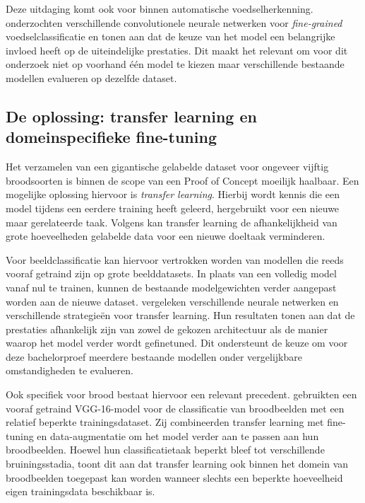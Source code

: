 Deze uitdaging komt ook voor binnen automatische voedselherkenning. \textcite{Boyd_2024} onderzochten verschillende convolutionele neurale netwerken voor \textit{fine-grained} voedselclassificatie en tonen aan dat de keuze van het model een belangrijke invloed heeft op de uiteindelijke prestaties. Dit maakt het relevant om voor dit onderzoek niet op voorhand één model te kiezen maar verschillende bestaande modellen evalueren op dezelfde dataset.

\subsection{De oplossing: transfer learning en domeinspecifieke fine-tuning}

Het verzamelen van een gigantische gelabelde dataset voor ongeveer vijftig broodsoorten is binnen de scope van een Proof of Concept moeilijk haalbaar. Een mogelijke oplossing hiervoor is \textit{transfer learning}. Hierbij wordt kennis die een model tijdens een eerdere training heeft geleerd, hergebruikt voor een nieuwe maar gerelateerde taak. Volgens \textcite{Zhuang_2021} kan transfer learning de afhankelijkheid van grote hoeveelheden gelabelde data voor een nieuwe doeltaak verminderen.

Voor beeldclassificatie kan hiervoor vertrokken worden van modellen die reeds vooraf getraind zijn op grote beelddatasets. In plaats van een volledig model vanaf nul te trainen, kunnen de bestaande modelgewichten verder aangepast worden aan de nieuwe dataset. \textcite{Abou_Baker_2022} vergeleken verschillende neurale netwerken en verschillende strategieën voor transfer learning. Hun resultaten tonen aan dat de prestaties afhankelijk zijn van zowel de gekozen architectuur als de manier waarop het model verder wordt gefinetuned. Dit ondersteunt de keuze om voor deze bachelorproef meerdere bestaande modellen onder vergelijkbare omstandigheden te evalueren.

Ook specifiek voor brood bestaat hiervoor een relevant precedent. \textcite{Tantiphanwadi2022} gebruikten een vooraf getraind VGG-16-model voor de classificatie van broodbeelden met een relatief beperkte trainingsdataset. Zij combineerden transfer learning met fine-tuning en data-augmentatie om het model verder aan te passen aan hun broodbeelden. Hoewel hun classificatietaak beperkt bleef tot verschillende bruiningsstadia, toont dit aan dat transfer learning ook binnen het domein van broodbeelden toegepast kan worden wanneer slechts een beperkte hoeveelheid eigen trainingsdata beschikbaar is.

